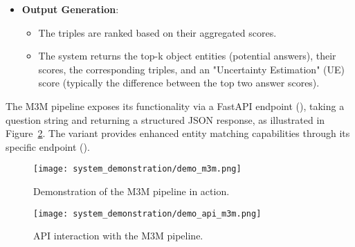 \begin{itemize}
\begin{itemize}
    \end{itemize}
    \item \textbf{Output Generation}:
    \begin{itemize}
        \item The triples are ranked based on their aggregated scores.
        \item The system returns the top-k object entities (potential answers), their scores, the corresponding triples, and an "Uncertainty Estimation" (UE) score (typically the difference between the top two answer scores).
    \end{itemize}
\end{itemize}
The M3M pipeline exposes its functionality via a FastAPI endpoint (), taking a question string and returning a structured JSON response, as illustrated in Figure~\ref{fig:demo_api_m3m}. The  variant provides enhanced entity matching capabilities through its specific endpoint ().

\begin{figure}[htb]
    \centering
    \texttt{[image: system\_demonstration/demo\_m3m.png]}
    \caption{Demonstration of the M3M pipeline in action.}
    \label{fig:demo_m3m}
\end{figure}

\begin{figure}[htb]
    \centering
    \texttt{[image: system\_demonstration/demo\_api\_m3m.png]}
    \caption{API interaction with the M3M pipeline.}
    \label{fig:demo_api_m3m}
\end{figure}

